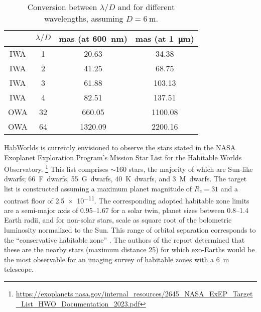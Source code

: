 \documentclass[
    usenatbib,
]{mnras}
\newcommand{\todo}[1]{\textcolor{red}{[#1]}}
\newcommand{\hwo}{HabWorlds}
\begin{document}
\begin{table}
    \centering
    \caption{
        Conversion between $\lambda / D$ and \si{\mas} for different wavelengths, assuming $D = \SI{6}{\meter}$. 
    }
    \label{tab:IWA_OWA}
    \begin{tabular}{ c c c c } 
    \toprule
     & $\lambda/D$ & mas (at \SI{600}{\nano\meter}) & mas (at \SI{1}{\micro\meter}) \\
    \midrule
    \midrule
    IWA & 1 & 20.63 & 34.38 \\
    IWA & 2 & 41.25 & 68.75 \\
    IWA & 3 & 61.88 & 103.13 \\
    IWA & 4 & 82.51 & 137.51 \\
    \midrule
    OWA & 32 &  660.05 & 1100.08 \\
    OWA & 64 & 1320.09 & 2200.16 \\
    \bottomrule
    \end{tabular}
\end{table}


\hwo{} is currently envisioned to observe the stars stated in the NASA Exoplanet Exploration Program's Mission Star List for the Habitable Worlds Observatory.
%
\footnote{\url{https://exoplanets.nasa.gov/internal_resources/2645_NASA_ExEP_Target_List_HWO_Documentation_2023.pdf}}
%
This list comprises $\sim$160 stars, the majority of which are Sun-like dwarfs; 66~F~dwarfs, 55~G~dwarfs, 40~K~dwarfs, and 3~M~dwarfs.
%
The target list is constructed assuming a maximum planet magnitude of $R_c = 31$ and a contrast floor of \num{2.5e-11}. 
The corresponding adopted habitable zone limits are a semi-major axis of \SIrange{0.95}{1.67}{\au} for a solar twin, planet sizes between \SIrange{0.8}{1.4}{} Earth radii, and for non-solar stars, scale as square root of the bolometric luminosity normalized to the Sun. 
%
This range of orbital separation corresponds to the \enquote{conservative habitable zone} \citep{kasting93, kopparapu13}. 
%
The authors of the report determined that these are the nearby stars (maximum distance \SI{25}{\parsec}) for which exo-Earths would be the most observable for an imaging survey of habitable zones with a \SI{6}{\meter} telescope. 
\end{document}
